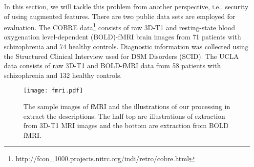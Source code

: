 \documentclass[10pt,journal,compsoc]{IEEEtran}
\begin{document}
In this section, we will tackle this problem from another perspective, i.e., security of using augmented features. There are two public data sets are employed for evaluation. The COBRE data\footnote{http://fcon\_1000.projects.nitrc.org/indi/retro/cobre.html} consists of raw 3D-T1 and resting-state blood oxygenation level-dependent (BOLD)-fMRI brain images from 71 patients with schizophrenia and 74 healthy controls. Diagnostic information was collected using the Structured Clinical Interview used for DSM Disorders (SCID). The UCLA data \cite{Poldrack2016A} consists of raw 3D-T1 and BOLD-fMRI data from 58 patients with schizophrenia and 132 healthy controls.

\begin{figure}[!t]
\centering
\texttt{[image: fmri.pdf]}
\caption{The sample images of fMRI and the illustrations of our processing in extract the descriptions. The half top are illustrations of extraction from 3D-T1 MRI images and the bottom are extraction from BOLD fMRI.}
\label{fig5}
\vskip -0.1in
\end{figure}
\end{document}
